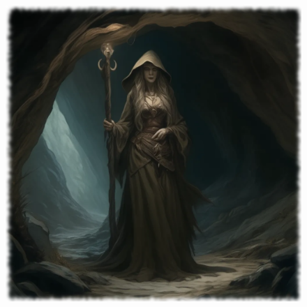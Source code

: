 \begin{figure}[h]
\begin{center}
\includegraphics[scale=0.24]{img/ai-images/hag.png}
\end{center}
\end{figure}
